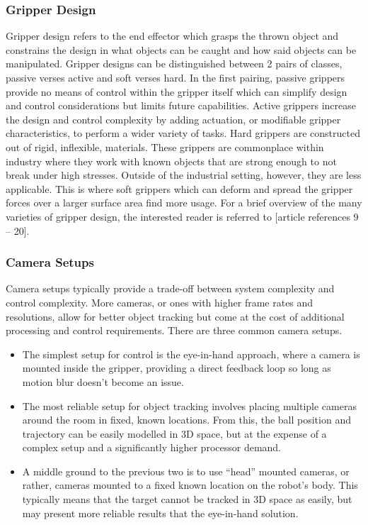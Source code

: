 \documentclass[conference]{IEEEtran}
\begin{document}
\subsubsection{Gripper Design}
Gripper design refers to the end effector which grasps the thrown object and constrains the design in what objects can be caught and how said objects can be manipulated. Gripper designs can be distinguished between 2 pairs of classes, passive verses active and soft verses hard.
In the first pairing, passive grippers provide no means of control within the gripper itself which can simplify design and control considerations but limits future capabilities. Active grippers increase the design and control complexity by adding actuation, or modifiable gripper characteristics, to perform a wider variety of tasks.
Hard grippers are constructed out of rigid, inflexible, materials. These grippers are commonplace within industry where they work with known objects that are strong enough to not break under high stresses. Outside of the industrial setting, however, they are less applicable. This is where soft grippers which can deform and spread the gripper forces over a larger surface area find more usage.
For a brief overview of the many varieties of gripper design, the interested reader is referred to [article references 9 – 20].

\subsubsection{Camera Setups}
Camera setups typically provide a trade-off between system complexity and control complexity. More cameras, or ones with higher frame rates and resolutions, allow for better object tracking but come at the cost of additional processing and control requirements.
There are three common camera setups.
\begin{itemize}
	\item The simplest setup for control is the eye-in-hand approach, where a camera is mounted inside the gripper, providing a direct feedback loop so long as motion blur doesn’t become an issue.
	\item The most reliable setup for object tracking involves placing multiple cameras around the room in fixed, known locations. From this, the ball position and trajectory can be easily modelled in 3D space, but at the expense of a complex setup and a significantly higher processor demand.
	\item A middle ground to the previous two is to use “head” mounted cameras, or rather, cameras mounted to a fixed known location on the robot's body. This typically means that the target cannot be tracked in 3D space as easily, but may present more reliable results that the eye-in-hand solution. 
\end{itemize}
\end{document}
